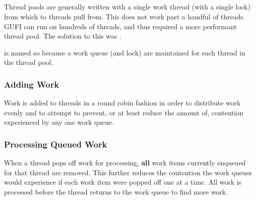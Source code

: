 \subsection{\qptp}
Thread pools are generally written with a single work thread (with a
single lock) from which to threads pull from. This does not work past
a handful of threads. GUFI can run on hundreds of threads, and thus
required a more performant thread pool. The solution to this was
\qptp.

\qptp is named so because a work queue (and lock) are
maintained for each thread in the thread pool.

\subsubsection{Adding Work}
Work is added to threads in a round robin fashion in order to
distribute work evenly and to attempt to prevent, or at least reduce
the amount of, contention experienced by any one work queue.

\subsubsection{Processing Queued Work}
When a thread pops off work for processing, {\bf all} work items
currently enqueued for that thread are removed. This further reduces
the contention the work queues would experience if each work item were
popped off one at a time. All work is processed before the thread
returns to the work queue to find more work.

